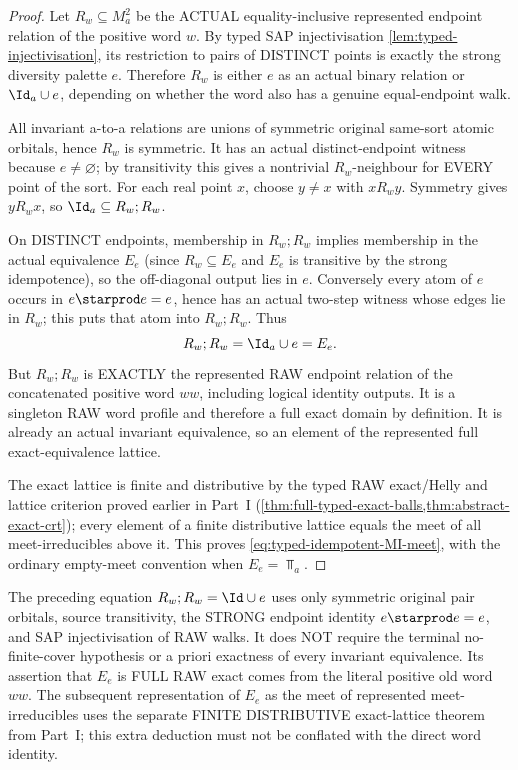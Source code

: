 \begin{proof}
Let \(R_w\subseteq M_a^2\) be the
ACTUAL equality-inclusive represented
endpoint relation of the positive word
\(w\). By typed SAP injectivisation
\cref{lem:typed-injectivisation},
its restriction to pairs of DISTINCT
points is exactly the strong
diversity palette \(e\).
Therefore \(R_w\) is either
\(e\) as an actual binary relation
or \(\Id_a\cup e\), depending on
whether the word also has a
genuine equal-endpoint walk.

All invariant a-to-a relations
are unions of symmetric original
same-sort atomic orbitals, hence
\(R_w\) is symmetric. It has an
actual distinct-endpoint witness
because \(e\ne\varnothing\);
by transitivity this gives a
nontrivial \(R_w\)-neighbour for
EVERY point of the sort.
For each real point \(x\), choose
\(y\ne x\) with \(xR_wy\).
Symmetry gives \(yR_wx\), so
\(\Id_a\subseteq R_w;R_w\).

On DISTINCT endpoints, membership
in \(R_w;R_w\) implies membership
in the actual equivalence
\(E_e\) (since \(R_w\subseteq E_e\)
and \(E_e\) is transitive by
the strong idempotence), so the
off-diagonal output lies in \(e\).
Conversely every atom of \(e\)
occurs in \(e\starprod e=e\),
hence has an actual two-step
witness whose edges lie in
\(R_w\); this puts that atom
into \(R_w;R_w\). Thus
\[
                    R_w;R_w
                       =\Id_a\cup e=E_e.
\]
But \(R_w;R_w\) is EXACTLY
the represented RAW endpoint
relation of the concatenated
positive word \(ww\), including
logical identity outputs.
It is a singleton RAW word
profile and therefore a full
exact domain by definition.
It is already an actual
invariant equivalence, so an
element of the represented
full exact-equivalence lattice.

The exact lattice is finite and
distributive by the typed RAW
exact/Helly and lattice criterion
proved earlier in Part~I
(\cref{thm:full-typed-exact-balls,thm:abstract-exact-crt}); every
element of a finite distributive
lattice equals the meet of all
meet-irreducibles above it.
This proves
\eqref{eq:typed-idempotent-MI-meet},
with the ordinary empty-meet
convention when \(E_e=\Top_a\).
\end{proof}

\begin{remark}
\label{rem:typed-idempotent-envelope-scope}
The preceding equation
\(R_w;R_w=\Id\cup e\)
uses only symmetric original
pair orbitals, source transitivity,
the STRONG endpoint identity
\(e\starprod e=e\), and SAP
injectivisation of RAW walks.
It does NOT require the
terminal no-finite-cover
hypothesis or a priori
exactness of every invariant
equivalence. Its assertion
that \(E_e\) is FULL RAW exact
comes from the literal
positive old word \(ww\).
The subsequent representation
of \(E_e\) as the meet of
represented meet-irreducibles
uses the separate FINITE
DISTRIBUTIVE exact-lattice
theorem from Part~I; this
extra deduction must not
be conflated with the direct
word identity.
\end{remark}

